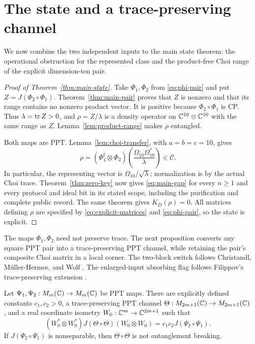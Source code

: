 \section{The state and a trace-preserving channel}\label{sec:applications}

We now combine the two independent inputs to the main state theorem: the
operational obstruction for the represented class and the product-free Choi
range of the explicit dimension-ten pair.

\begin{proof}[Proof of Theorem~\ref{thm:main-state}]
Take $\Phi_1,\Phi_2$ from \eqref{eq:phi-pair} and put
$Z=J(\Phi_2\circ\Phi_1)$.  Theorem~\ref{thm:main-pair} proves that $Z$ is
nonzero and that its range contains no nonzero product vector.  It is
positive because $\Phi_2\circ\Phi_1$ is CP.  Thus $\lambda=\operatorname{tr} Z>0$, and
$\rho=Z/\lambda$ is a density operator on $\mathbb C^{10}\otimes\mathbb C^{10}$ with the
same range as $Z$.  Lemma~\ref{lem:product-range} makes $\rho$ entangled.

Both maps are PPT.  Lemma~\ref{lem:choi-transfer}, with $a=b=c=10$, gives
\[
 \rho=(\Phi_1^\sharp\otimes\Phi_2)
       \left(\frac{\Omega_{10}\Omega_{10}^*}{\lambda}\right)
       \in\mathscr C.
\]
In particular, the representing vector is
$\Omega_{10}/\sqrt{\lambda}$; normalization is by the actual Choi trace.
Theorem~\ref{thm:zero-key} now gives \eqref{eq:main-gap} for every $n\geq1$
and every protocol and ideal bit in its stated scope, including the
purification and complete public record.  The same theorem gives
$K_D(\rho)=0$.  All matrices defining $\rho$ are specified by
\eqref{eq:explicit-matrices} and \eqref{eq:phi-pair}, so the state is
explicit.
\end{proof}

The maps $\Phi_1,\Phi_2$ need not preserve trace.  The next proposition
converts any square PPT pair into a trace-preserving PPT channel, while
retaining the pair's composite Choi matrix in a local corner.  The
two-block switch follows Christandl, Müller-Hermes, and Wolf
\cite[Section IV.A]{CMHW2019}.  The enlarged-input absorbing flag follows
Filippov's trace-preserving extension
\cite[Proposition 3, Equation (15)]{Filippov2021}.

\begin{proposition}\label{prop:channel-completion}
Let $\Psi_1,\Psi_2:M_{m}(\mathbb C)\to M_{m}(\mathbb C)$ be PPT maps.  There are explicitly
defined constants $c_1,c_2>0$, a trace-preserving PPT channel
$\Theta:M_{2m+1}(\mathbb C)\to M_{2m+1}(\mathbb C)$, and a real coordinate isometry
$W_0:\mathbb C^m\to\mathbb C^{2m+1}$ such that
\begin{equation}\label{eq:choi-corner}
 (W_0^*\otimes W_0^*)J(\Theta\circ\Theta)(W_0\otimes W_0)
       =c_1c_2J(\Psi_2\circ\Psi_1).
\end{equation}
If $J(\Psi_2\circ\Psi_1)$ is nonseparable, then $\Theta\circ\Theta$ is
not entanglement breaking.
\end{proposition}

